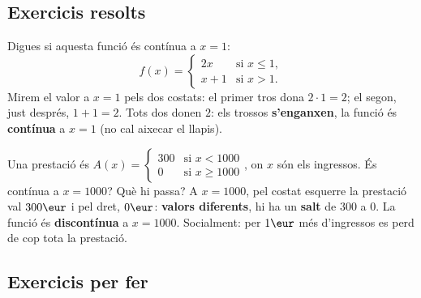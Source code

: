 \subsection{Exercicis resolts}

\begin{exresolt}
Digues si aquesta funció és contínua a $x=1$:
\[
f(x)=
\begin{cases}
2x & \text{si } x\le 1,\\[2pt]
x+1 & \text{si } x>1.
\end{cases}
\]
\solucio
Mirem el valor a $x=1$ pels dos costats: el primer tros dona $2\cdot 1=2$; el segon,
just després, $1+1=2$. Tots dos donen $2$: els trossos \textbf{s'enganxen}, la funció
és \textbf{contínua} a $x=1$ (no cal aixecar el llapis).
\end{exresolt}

\begin{exresolt}
Una prestació és $A(x)=\begin{cases}300 & \text{si } x<\num{1000}\\ 0 & \text{si } x\ge\num{1000}\end{cases}$,
on $x$ són els ingressos. És contínua a $x=\num{1000}$? Què hi passa?
\solucio
A $x=\num{1000}$, pel costat esquerre la prestació val $300\eur$ i pel dret, $0\eur$:
\textbf{valors diferents}, hi ha un \textbf{salt} de $300$ a $0$. La funció és
\textbf{discontínua} a $x=\num{1000}$. Socialment: per $1\eur$ més d'ingressos es perd
de cop tota la prestació.
\end{exresolt}

\subsection{Exercicis per fer}

